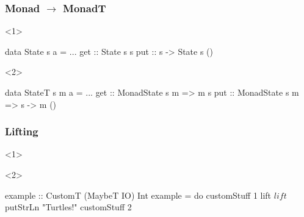 \documentclass[20pt]{beamer}
\renewcommand{\(}[1]{\begin{columns}[#1]}
\renewcommand{\)}{\end{columns}}
\newcommand{\<}[1]{\begin{column}{#1\textwidth}}
\renewcommand{\>}{\end{column}}
\begin{document}
\begin{frame}[fragile]
  \frametitle{Monad $\rightarrow$ MonadT}
  \vspace{1cm}
  \begin{onlyenv}<1>
    \begin{code}
    data State s a = { ... }
    get :: State s s
    put :: s -> State s ()
    \end{code}
  \end{onlyenv}
  \begin{onlyenv}<2>
    \begin{code}
    data StateT s m a = { ... }
    get :: MonadState s m => m s
    put :: MonadState s m => s -> m ()
    \end{code}
  \end{onlyenv}
  \begin{center}
  \end{center}
\end{frame}

\begin{frame}[fragile]
  \frametitle{Lifting}
  \begin{onlyenv}<1>
  \end{onlyenv}
  \begin{onlyenv}<2>
    \begin{code}
    example :: CustomT (MaybeT IO) Int
    example = do
        customStuff 1
        lift $ lift $ putStrLn "Turtles!"
        customStuff 2
    \end{code}%
  \end{onlyenv}
\end{frame}
\end{document}
